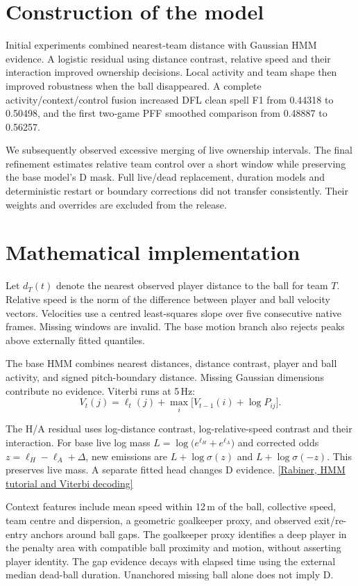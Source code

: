 \documentclass[10pt,a4paper]{article}
\begin{document}
\section{Construction of the model}

Initial experiments combined nearest-team distance with Gaussian HMM evidence. A logistic residual using
distance contrast, relative speed and their interaction improved ownership decisions. Local activity and
team shape then improved robustness when the ball disappeared. A complete activity/context/control fusion
increased DFL clean spell F1 from 0.44318 to 0.50498, and the first two-game PFF smoothed comparison from
0.48887 to 0.56257.

We subsequently observed excessive merging of live ownership intervals. The final refinement estimates
relative team control over a short window while preserving the base model's D mask. Full live/dead
replacement, duration models and deterministic restart or boundary corrections did not transfer
consistently. Their weights and overrides are excluded from the release.

\section{Mathematical implementation}

Let $d_T(t)$ denote the nearest observed player distance to the ball for team $T$. Relative speed is the
norm of the difference between player and ball velocity vectors. Velocities use a centred least-squares
slope over five consecutive native frames. Missing windows are invalid. The base motion branch also
rejects peaks above externally fitted quantiles.

The base HMM combines nearest distances, distance contrast, player and ball activity, and signed
pitch-boundary distance. Missing Gaussian dimensions contribute no evidence. Viterbi runs at 5\,Hz:
\[
  V_t(j)=\ell_t(j)+\max_i\bigl[V_{t-1}(i)+\log P_{ij}\bigr].
\]

The H/A residual uses log-distance contrast, log-relative-speed contrast and their interaction. For base
live log mass $L=\log\bigl(e^{\ell_H}+e^{\ell_A}\bigr)$ and corrected odds $z=\ell_H-\ell_A+\Delta$, new
emissions are $L+\log\sigma(z)$ and $L+\log\sigma(-z)$. This preserves live mass. A separate fitted head
changes D evidence. \href{https://doi.org/10.1109/5.18626}{[Rabiner, HMM tutorial and Viterbi decoding]}

Context features include mean speed within 12\,m of the ball, collective speed, team centre and
dispersion, a geometric goalkeeper proxy, and observed exit/re-entry anchors around ball gaps. The
goalkeeper proxy identifies a deep player in the penalty area with compatible ball proximity and motion,
without asserting player identity. The gap evidence decays with elapsed time using the external median
dead-ball duration. Unanchored missing ball alone does not imply D.
\end{document}
